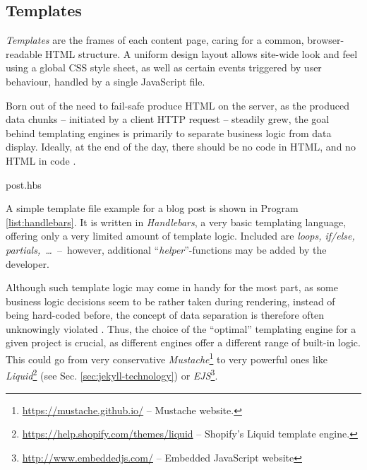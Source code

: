 \subsection{Templates}
\label{sec:buildpipelines-templates}

\emph{Templates} are the frames of each content page, caring for a common, browser-readable HTML structure. A uniform design layout allows site-wide look and feel using a global CSS style sheet, as well as certain events triggered by user behaviour, handled by a single JavaScript file.

Born out of the need to fail-safe produce HTML on the server, as the produced data chunks -- initiated by a client HTTP request -- steadily grew, the goal behind templating engines is primarily to separate business logic from data display. Ideally, at the end of the day, there should be no code in HTML, and no HTML in code \cite[225]{Parr2004templates}.

\begin{program}
  \caption{post.hbs}
  \label{list:handlebars}

\end{program}

A simple template file example for a blog post is shown in Program \ref{list:handlebars}. It is written in \emph{Handlebars}, a very basic templating language, offering only a very limited amount of template logic. Included are \emph{loops, if/else, partials,~\ldots}~--~however, additional ``\emph{helper}''-functions may be added by the developer.

Although such template logic may come in handy for the most part, as some business logic decisions seem to be rather taken during rendering, instead of being hard-coded before, the concept of data separation is therefore often unknowingly violated \cite[228]{Parr2004templates}. Thus, the choice of the ``optimal'' templating engine for a given project is crucial, as different engines offer a different range of built-in logic. This could go from very conservative \emph{Mustache}\footnote{\url{https://mustache.github.io/} -- Mustache website.} to very powerful ones like \emph{Liquid}\footnote{\url{https://help.shopify.com/themes/liquid} -- Shopify's Liquid template engine.} (see Sec. \ref{sec:jekyll-technology}) or \emph{EJS}\footnote{\url{http://www.embeddedjs.com/} -- Embedded JavaScript website}.
